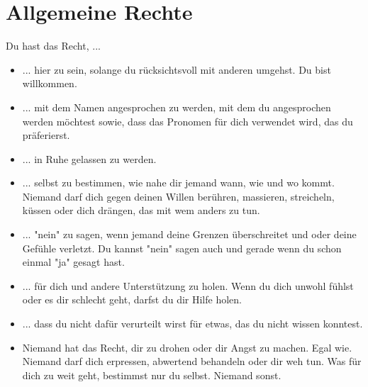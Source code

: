 \documentclass{article}
\begin{document}
\section{Allgemeine Rechte}
Du hast das Recht, ...
\begin{itemize}
    \item 	... hier zu sein, solange du rücksichtsvoll mit anderen umgehst. Du bist willkommen.

    \item   ... mit dem Namen angesprochen zu werden, mit dem du angesprochen werden möchtest sowie, dass das Pronomen für dich verwendet wird, das du präferierst.

    \item 	... in Ruhe gelassen zu werden.

    \item 	... selbst zu bestimmen, wie nahe dir jemand wann, wie und wo kommt. Niemand darf dich gegen deinen Willen berühren, massieren, streicheln, küssen oder dich drängen, das mit wem anders zu tun.

    \item 	... "nein" zu sagen, wenn jemand deine Grenzen überschreitet und oder deine Gefühle verletzt. Du kannst "nein" sagen auch und gerade wenn du schon einmal "ja" gesagt hast.

    \item 	... für dich und andere Unterstützung zu holen. Wenn du dich unwohl fühlst oder es dir schlecht geht, darfst du dir Hilfe holen.

    \item 	... dass du nicht dafür verurteilt wirst für etwas, das du nicht wissen konntest.

    \item 	Niemand hat das Recht, dir zu drohen oder dir Angst zu machen. Egal wie. Niemand darf dich erpressen, abwertend behandeln oder dir weh tun. Was für dich zu weit geht, bestimmst nur du selbst. Niemand sonst.

\end{itemize}
\end{document}
